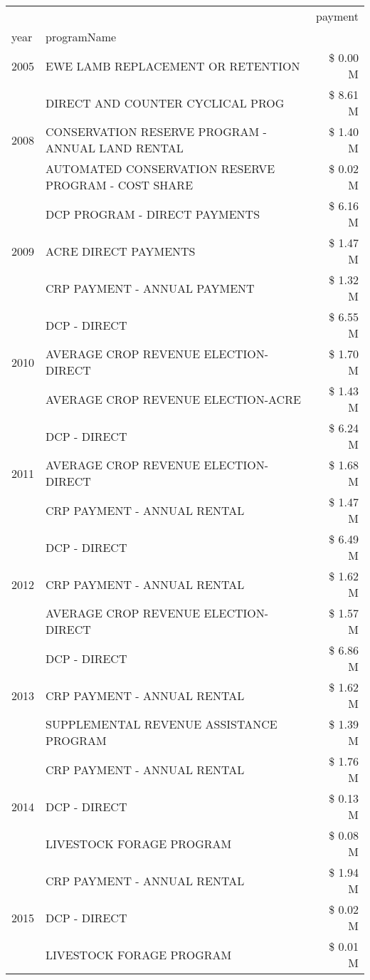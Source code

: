 \begin{tabular}{llr}
\toprule
 &  & payment \\
year & programName &  \\
\midrule
2005 & EWE LAMB REPLACEMENT OR RETENTION & \$ 0.00 M \\
\cline{1-3}
\multirow[t]{3}{*}{2008} & DIRECT AND COUNTER CYCLICAL PROG & \$ 8.61 M \\
 & CONSERVATION RESERVE PROGRAM - ANNUAL LAND RENTAL & \$ 1.40 M \\
 & AUTOMATED CONSERVATION RESERVE PROGRAM - COST SHARE & \$ 0.02 M \\
\cline{1-3}
\multirow[t]{3}{*}{2009} & DCP PROGRAM - DIRECT PAYMENTS & \$ 6.16 M \\
 & ACRE DIRECT PAYMENTS & \$ 1.47 M \\
 & CRP PAYMENT - ANNUAL PAYMENT & \$ 1.32 M \\
\cline{1-3}
\multirow[t]{3}{*}{2010} & DCP - DIRECT & \$ 6.55 M \\
 & AVERAGE CROP REVENUE ELECTION-DIRECT & \$ 1.70 M \\
 & AVERAGE CROP REVENUE ELECTION-ACRE & \$ 1.43 M \\
\cline{1-3}
\multirow[t]{3}{*}{2011} & DCP - DIRECT & \$ 6.24 M \\
 & AVERAGE CROP REVENUE ELECTION-DIRECT & \$ 1.68 M \\
 & CRP PAYMENT - ANNUAL RENTAL & \$ 1.47 M \\
\cline{1-3}
\multirow[t]{3}{*}{2012} & DCP - DIRECT & \$ 6.49 M \\
 & CRP PAYMENT - ANNUAL RENTAL & \$ 1.62 M \\
 & AVERAGE CROP REVENUE ELECTION-DIRECT & \$ 1.57 M \\
\cline{1-3}
\multirow[t]{3}{*}{2013} & DCP - DIRECT & \$ 6.86 M \\
 & CRP PAYMENT - ANNUAL RENTAL & \$ 1.62 M \\
 & SUPPLEMENTAL REVENUE ASSISTANCE PROGRAM & \$ 1.39 M \\
\cline{1-3}
\multirow[t]{3}{*}{2014} & CRP PAYMENT - ANNUAL RENTAL & \$ 1.76 M \\
 & DCP - DIRECT & \$ 0.13 M \\
 & LIVESTOCK FORAGE PROGRAM & \$ 0.08 M \\
\cline{1-3}
\multirow[t]{3}{*}{2015} & CRP PAYMENT - ANNUAL RENTAL & \$ 1.94 M \\
 & DCP - DIRECT & \$ 0.02 M \\
 & LIVESTOCK FORAGE PROGRAM & \$ 0.01 M \\

\end{tabular}
